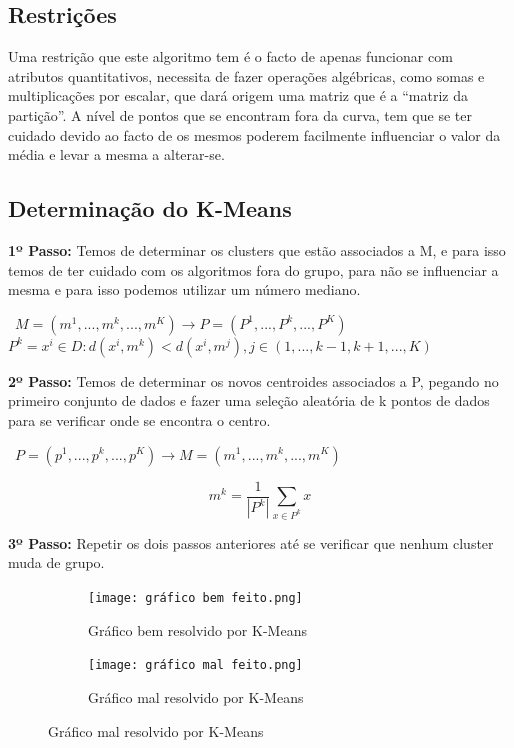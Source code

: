 \documentclass[12pt, a4paper, oneside]{scrreport}
\begin{document}
\subsection{Restrições}
\quad Uma restrição que este algoritmo tem é o facto de apenas funcionar com atributos quantitativos, necessita de fazer operações algébricas, como somas e multiplicações por escalar, que dará origem uma matriz que é a “matriz da partição”. A nível de pontos que se encontram fora da curva, tem que se ter cuidado devido ao facto de os mesmos poderem facilmente influenciar o valor da média e levar a mesma a alterar-se.
\subsection{Determinação do K-Means}
\textbf{1º Passo:}
Temos de determinar os clusters que estão associados a M, e para isso temos de ter cuidado com os algoritmos fora do grupo, para não se influenciar a mesma e para isso podemos utilizar um número mediano.
	\begin{center}
	\ $ M=(m^{1},...,m^{k},...,m^{K})\rightarrow P=(P^{1},...,P^{k},...,P^{K})$
	\ $P^{k}=x^{i}\in D:d(x^{i},m^{k})< d(x^{i},m^{j}),j\in(1,...,k-1,k+1,...,K)$
	\end{center}	 
\textbf{2º Passo:}
Temos de determinar os novos centroides associados a P, pegando no primeiro conjunto de dados e fazer uma seleção aleatória de k pontos de dados para se verificar onde se encontra o centro.
	\begin{center}
	\ $ P=(p^{1},...,p^{k},...,p^{K})\rightarrow M=(m^{1},...,m^{k},...,m^{K})$
	\begin{myequation}[!ht]
$$ m^k = \frac{1}{|P^k|}\sum_{x \in P^k} x
	  $$
	 \caption{\small Fórmula do K-Means}

\end{myequation}
\end{center}
\textbf{3º Passo:}
Repetir os dois passos anteriores até se verificar que nenhum cluster muda de grupo.
 	\begin{center}
	\begin{figure}[h]
	\begin{subfigure}{.5\textwidth}
	\texttt{[image: gráfico bem feito.png]}
	\caption{Gráfico bem resolvido por K-Means}
	\end{subfigure}
	\begin{subfigure}{.5\textwidth}
	\texttt{[image: gráfico mal feito.png]}
	\caption{Gráfico mal resolvido por K-Means}
	\end{subfigure}
	\end{figure}
	\end{center}
	
\end{document}
